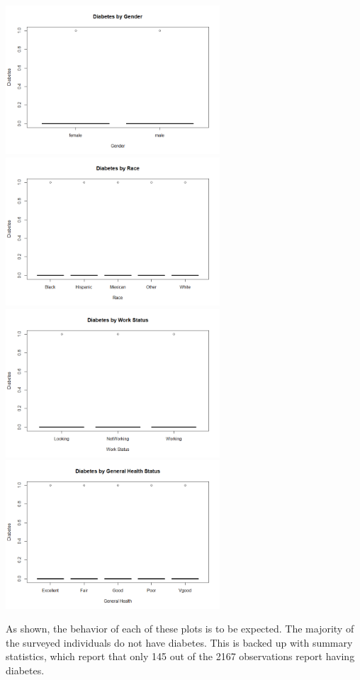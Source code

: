 \documentclass[letter,12pt]{article}
\begin{document}
	\begin{center}
	  \includegraphics[width=0.6\textwidth]{img/boxdiabetesgender.png}
	  \includegraphics[width=0.6\textwidth]{img/boxdiabetesrace.png}
	  \includegraphics[width=0.6\textwidth]{img/boxdiabeteswork.png}
	  \includegraphics[width=0.6\textwidth]{img/boxdiabeteshealthgen.png}
	\end{center}
	As shown, the behavior of each of these plots is to be expected. The majority of the surveyed individuals do not have diabetes. This is backed up with summary statistics, which report that only 145 out of the 2167 observations report having diabetes.\par
\end{document}
